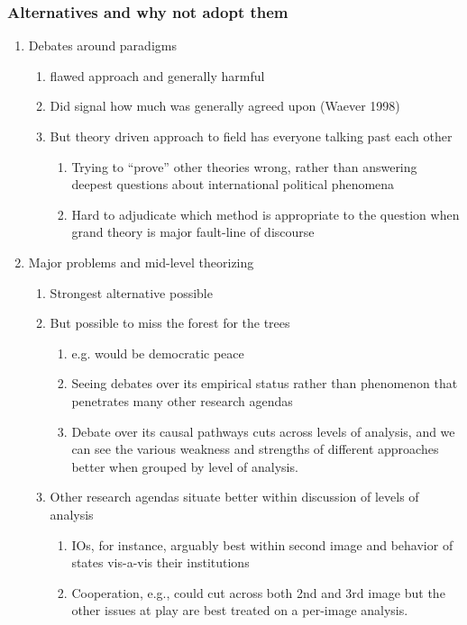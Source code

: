\documentclass[11pt]{article}
\begin{document}
\subsubsection{Alternatives and why not adopt them}
\label{sec-5-2-3}
\begin{enumerate}
\item Debates around paradigms
\begin{enumerate}
\item flawed approach and generally harmful
\item Did signal how much was generally agreed upon (Waever 1998)
\item But theory driven approach to field has everyone talking past
each other
\begin{enumerate}
\item Trying to ``prove'' other theories wrong, rather than answering
deepest questions about international political phenomena
\item Hard to adjudicate which method is appropriate to the
question when grand theory is major fault-line of discourse
\end{enumerate}
\end{enumerate}
\item Major problems and mid-level theorizing
\begin{enumerate}
\item Strongest alternative possible
\item But possible to miss the forest for the trees
\begin{enumerate}
\item e.g. would be democratic peace
\item Seeing debates over its empirical status rather than
phenomenon that penetrates many other research agendas
\item Debate over its causal pathways cuts across levels of
analysis, and we can see the various weakness and strengths
of different approaches better when grouped by level of analysis.
\end{enumerate}
\item Other research agendas situate better within discussion of
levels of analysis
\begin{enumerate}
\item IOs, for instance, arguably best within second image and
behavior of states vis-a-vis their institutions
\item Cooperation, e.g., could cut across both 2nd and 3rd image
but the other issues at play are best treated on a per-image analysis.
\end{enumerate}
\end{enumerate}
\end{enumerate}
\end{document}
